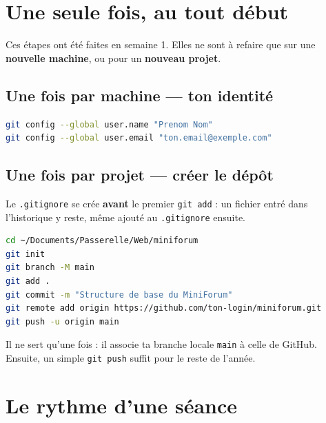 \documentclass[a4paper,11pt]{article}
\begin{document}
\section{Une seule fois, au tout début}

Ces étapes ont été faites en semaine 1. Elles ne sont à refaire que sur une \textbf{nouvelle machine}, ou pour un \textbf{nouveau projet}.

\subsection{Une fois par machine --- ton identité}

\begin{lstlisting}[language=bash]
git config --global user.name "Prenom Nom"
git config --global user.email "ton.email@exemple.com"
\end{lstlisting}

\subsection{Une fois par projet --- créer le dépôt}

Le \texttt{.gitignore} se crée \textbf{avant} le premier \texttt{git add} : un fichier entré dans l'historique y reste, même ajouté au \texttt{.gitignore} ensuite.

\begin{lstlisting}[language=bash]
cd ~/Documents/Passerelle/Web/miniforum
git init
git branch -M main
git add .
git commit -m "Structure de base du MiniForum"
git remote add origin https://github.com/ton-login/miniforum.git
git push -u origin main
\end{lstlisting}

\begin{tcolorbox}[astuce, title={Le \texttt{-u} du premier push}]
Il ne sert qu'une fois : il associe ta branche locale \texttt{main} à celle de GitHub. Ensuite, un simple \texttt{git push} suffit pour le reste de l'année.
\end{tcolorbox}

\section{Le rythme d'une séance}
\end{document}
